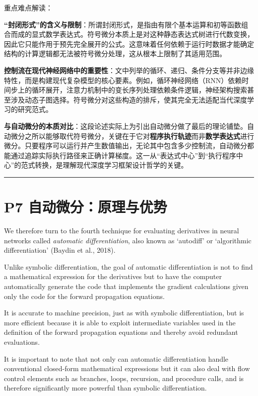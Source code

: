 \documentclass{article}
\begin{document}
{\color{blue}
重点难点解读：

\textbf{“封闭形式”的含义与限制}：所谓封闭形式，是指由有限个基本运算和初等函数组合而成的显式数学表达式。符号微分本质上是对这种静态表达式树进行代数变换，因此它只能作用于预先完全展开的公式。这意味着任何依赖于运行时数据才能确定结构的计算逻辑都无法被符号微分处理，这从根本上限制了其适用范围。

\textbf{控制流在现代神经网络中的重要性}：文中列举的循环、递归、条件分支等并非边缘特性，而是构建现代复杂模型的核心要素。例如，循环神经网络（RNN）依赖时间步上的循环展开，注意力机制中的变长序列处理依赖条件逻辑，神经架构搜索甚至涉及动态子图选择。符号微分对这些构造的排斥，使其完全无法适配当代深度学习的研究范式。

\textbf{与自动微分的本质对比}：这段论述实际上为引出自动微分做了最后的理论铺垫。自动微分之所以能够取代符号微分，关键在于它对\textbf{程序执行轨迹}而非\textbf{数学表达式}进行微分。只要程序可以运行并产生数值输出，无论其中包含多少控制流，自动微分都能通过追踪实际执行路径来正确计算梯度。这一从“表达式中心”到“执行程序中心”的范式转换，是理解现代深度学习框架设计哲学的关键。
}

\noindent\rule{\linewidth}{0.4pt}

\section{P7 自动微分：原理与优势}

We therefore turn to the fourth technique for evaluating derivatives in neural networks called \textit{automatic differentiation}, also known as `autodiff' or `algorithmic differentiation' (Baydin et al., 2018). 

Unlike symbolic differentiation, the goal of automatic differentiation is not to find a mathematical expression for the derivatives but to have the computer automatically generate the code that implements the gradient calculations given only the code for the forward propagation equations. 

It is accurate to machine precision, just as with symbolic differentiation, but is more efficient because it is able to exploit intermediate variables used in the definition of the forward propagation equations and thereby avoid redundant evaluations. 

It is important to note that not only can automatic differentiation handle conventional closed-form mathematical expressions but it can also deal with flow control elements such as branches, loops, recursion, and procedure calls, and is therefore significantly more powerful than symbolic differentiation. 
\end{document}
